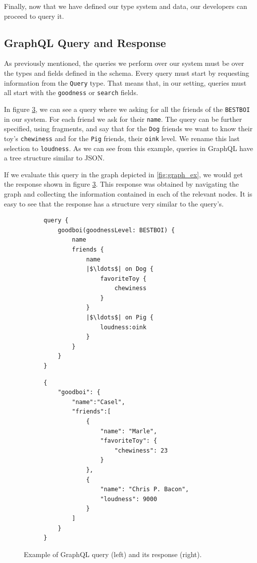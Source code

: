 Finally, now that we have defined our type system and data, our developers can proceed to query it.

\subsection*{GraphQL Query and Response}

As previously mentioned, the queries we perform over our system must be over the types and fields defined in the schema. Every query must start by requesting information from the \texttt{Query} type. That means that, in our setting, queries must all start with the \texttt{goodness} or \texttt{search} fields. 

In figure \ref{fig:qres_ex}, we can see a query where we asking for all the friends of the \texttt{BESTBOI} in our system. For each friend we ask for their \texttt{name}. The query can be further specified, using fragments, and say that for the \texttt{Dog} friends we want to know their toy's \texttt{chewiness} and for the \texttt{Pig} friends, their \texttt{oink} level. We rename this last selection to \texttt{loudness}. As we can see from this example, queries in GraphQL have a tree structure similar to JSON.

If we evaluate this query in the graph depicted in \ref{fig:graph_ex}, we would get the response shown in figure \ref{fig:qres_ex}. This response was obtained by navigating the graph and collecting the information contained in each of the relevant nodes. It is easy to see that the response has a structure very similar to the query's.

\begin{figure}
\centering
\begin{subfigure}{.5\textwidth}
\begin{verbatim}
query {
    goodboi(goodnessLevel: BESTBOI) {
        name
        friends {
            name 
            |$\ldots$| on Dog {
                favoriteToy {
                    chewiness
                }
            }
            |$\ldots$| on Pig {
                loudness:oink
            }
        }
    }
}
\end{verbatim}
\label{fig:query_ex}
\end{subfigure}%
\begin{subfigure}{.5\textwidth}
\begin{verbatim}
{
    "goodboi": {
        "name":"Casel",
        "friends":[
            {
                "name": "Marle",
                "favoriteToy": {
                    "chewiness": 23                
                }
            },
            {
                "name": "Chris P. Bacon",
                "loudness": 9000
            }
        ]
    }
}
\end{verbatim}
\label{fig:response_ex}
\end{subfigure}

\caption{Example of GraphQL query (left) and its response (right).}
\label{fig:qres_ex}
\end{figure}

